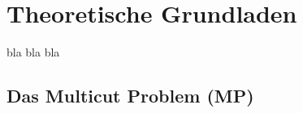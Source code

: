 \chapter{Theoretische Grundladen}\label{ch:examples}
bla bla bla


\section{Das Multicut Problem (MP)}



